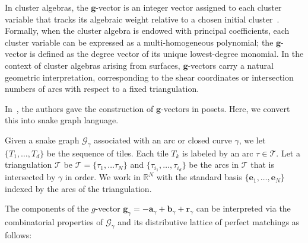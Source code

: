 \documentclass[11pt]{amsart}
\theoremstyle{definition}
\theoremstyle{remark}
\numberwithin{equation}{section}
\begin{document}
In cluster algebras, the $\mathbf{g}$-vector is an integer vector assigned to each cluster variable that tracks its algebraic weight relative to a chosen initial cluster~\cite{FZ2007}. Formally, when the cluster algebra is endowed with principal coefficients, each cluster variable can be expressed as a multi-homogeneous polynomial; the $\mathbf{g}$-vector is defined as the degree vector of its unique lowest-degree monomial. In the context of cluster algebras arising from surfaces, $\mathbf{g}$-vectors carry a natural geometric interpretation, corresponding to the shear coordinates or intersection numbers of arcs with respect to a fixed triangulation.

In~\cite{banaian2024skein}, the authors gave the construction of $\mathbf{g}$-vectors in posets. Here, we convert this into snake graph language. 

Given a snake graph $\mathcal{G}_\gamma$ associated with an arc or closed curve $\gamma$, we let $\{T_1, \dots, T_d\}$ be the sequence of tiles. Each tile $T_k$ is labeled by an arc $\tau \in \mathcal{T}$. Let a triangulation $\mathcal{T}$ be $\mathcal{T}=\{\tau_1,\ldots\tau_N\}$ and $\{\tau_{i_1},\ldots,\tau_{i_d}\}$ be the arcs in $\mathcal{T}$ that is intersected by $\gamma$ in order. We work in $\mathbb{R}^N$ with the standard basis $\{\mathbf{e}_1, \dots, \mathbf{e}_N\}$ indexed by the arcs of the triangulation.

The components of the $g$-vector $\mathbf{g}_\gamma = -\mathbf{a}_\gamma + \mathbf{b}_\gamma + \mathbf{r}_\gamma$ can be interpreted via the combinatorial properties of $\mathcal{G}_\gamma$ and its distributive lattice of perfect matchings as follows:
\end{document}
